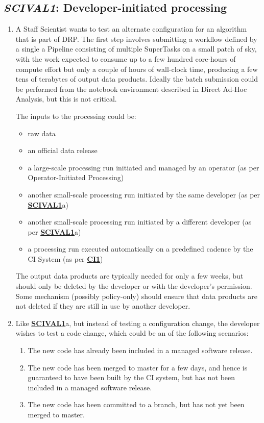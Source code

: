 \documentclass[DM,toc,lsstdraft]{lsstdoc}
\newcommand{\usecase}[3]{%
\subsection{\emph{#1}: #2}
\label{use:#1}
\begin{enumerate}[label=\alph*.]
#3
\end{enumerate}
}
\newcommand{\useref}[1]{\hyperref[use:#1]{\textcolor{lsstblue}{\textbf{#1}}}}
\begin{document}
\usecase{SCIVAL1}{Developer-initiated processing}{%

\item
A Staff Scientist wants to test an alternate configuration for an algorithm that is part of DRP.
The first step involves submitting a workflow defined by a single a Pipeline consisting of multiple SuperTasks on a small patch of sky, with the work expected to consume up to a few hundred core-hours of compute effort but only a couple of hours of wall-clock time, producing a few tens of terabytes of output data products.
Ideally the batch submission could be performed from the notebook environment described in Direct Ad-Hoc Analysis, but this is not critical.

The inputs to the processing could be:
\begin{itemize}
\item raw data
\item an official data release
\item a large-scale processing run initiated and managed by an operator (as per Operator-Initiated Processing)
\item another small-scale processing run initiated by the same developer (as per \useref{SCIVAL1}a)
\item another small-scale processing run initiated by a different developer (as per \useref{SCIVAL1}a)
\item a processing run executed automatically on a predefined cadence by the CI System (as per \useref{CI1})
\end{itemize}

The output data products are typically needed for only a few weeks, but should only be deleted by the developer or with the developer's permission.  Some mechanism (possibly policy-only) should ensure that data products are not deleted if they are still in use by another developer.

\item
Like \useref{SCIVAL1}a, but instead of testing a configuration change, the developer wishes to test a code change, which could be an of the following scenarios:

\begin{enumerate}
\item The new code has already been included in a managed software release.
\item The new code has been merged to master for a few days, and hence is guaranteed to have been built by the CI system, but has not been included in a managed software release.
\item The new code has been committed to a branch, but has not yet been merged to master.
\end{enumerate}

}
\end{document}
